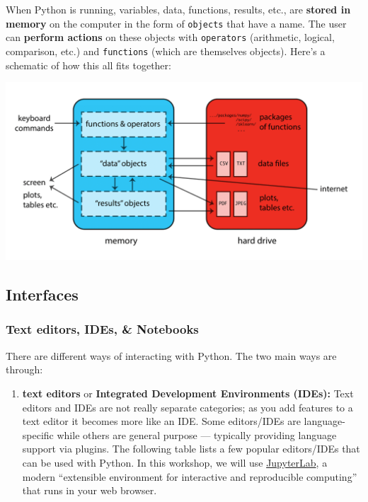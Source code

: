 \documentclass[]{book}
\providecommand{\tightlist}{%
  \setlength{\itemsep}{0pt}\setlength{\parskip}{0pt}}
\begin{document}
When Python is running, variables, data, functions, results, etc., are \textbf{stored in memory}
on the computer in the form of \texttt{objects} that have a name. The user can
\textbf{perform actions} on these objects with \texttt{operators} (arithmetic, logical,
comparison, etc.) and \texttt{functions} (which are themselves objects). Here's a
schematic of how this all fits together:

\includegraphics{Python/PythonIntro/images/python_works.png}

\hypertarget{interfaces-1}{%
\subsection{Interfaces}\label{interfaces-1}}

\hypertarget{text-editors-ides-notebooks-1}{%
\subsubsection{Text editors, IDEs, \& Notebooks}\label{text-editors-ides-notebooks-1}}

There are different ways of interacting with Python. The two main ways are through:

\begin{enumerate}
\def\labelenumi{\arabic{enumi}.}
\tightlist
\item
  \textbf{text editors} or \textbf{Integrated Development Environments (IDEs):} Text editors and IDEs are not really separate categories; as you add features to a text editor it becomes more like an IDE. Some editors/IDEs are language-specific while others are general purpose --- typically providing language support via plugins. The following table lists a few popular editors/IDEs that can be used with Python. In this workshop, we will use \href{https://jupyter.org/}{JupyterLab}, a modern ``extensible environment for interactive and reproducible computing'' that runs in your web browser.
\end{enumerate}
\end{document}
